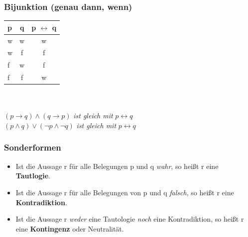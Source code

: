 \documentclass[a4paper,12pt]{scrartcl}
\begin{document}
\subsubsection{Bijunktion (genau dann, wenn)}
\begin{tabular}{lc|c}
  p & q & p $\leftrightarrow$ q\\
  \hline
  w & w & w \\
  w & f & f \\
  f & w & f \\
  f & f & w \\
\end{tabular}
\\
\\ $(p \to q) \land (q \to p)$ \textit{ist gleich mit} $p \leftrightarrow q$
\\ $(p \land q) \vee (\neg p \land \neg q)$ \textit{ist gleich mit} $p \leftrightarrow q$

\subsubsection{Sonderformen}

\begin{itemize}
\item Ist die Aussage r für alle Belegungen p und q \textit{wahr}, so heißt r eine \textbf{Tautlogie}.
\item Ist die Aussage r für alle Belegungen von p und q \textit{falsch}, so heißt r eine  \textbf{Kontradiktion}.
\item Ist die Aussage r \textit{weder} eine Tautologie \textit{noch} eine Kontradiktion, so heißt r eine \textbf{Kontingenz} oder Neutralität.
\end{itemize}
\end{document}
